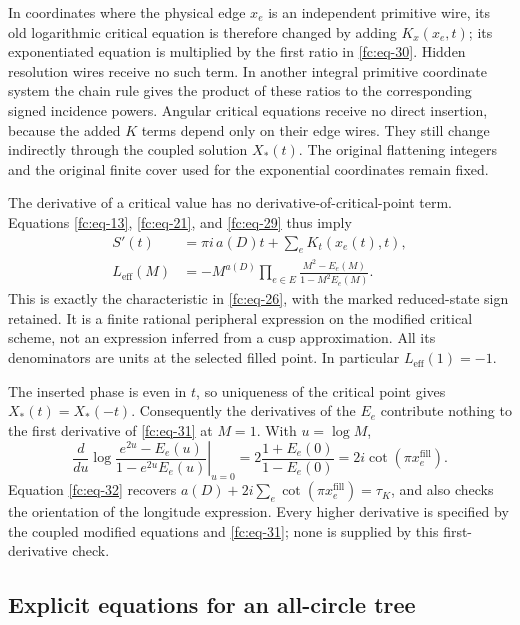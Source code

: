 In coordinates where the physical edge \(x_e\) is an independent primitive wire, its old logarithmic critical equation is therefore changed by adding \(K_x(x_e,t)\); its exponentiated equation is multiplied by the first ratio in \eqref{fc:eq-30}. Hidden resolution wires receive no such term. In another integral primitive coordinate system the chain rule gives the product of these ratios to the corresponding signed incidence powers. Angular critical equations receive no direct insertion, because the added \(K\) terms depend only on their edge wires. They still change indirectly through the coupled solution \(X_*(t)\). The original flattening integers and the original finite cover used for the exponential coordinates remain fixed.

The derivative of a critical value has no derivative-of-critical-point term. Equations \eqref{fc:eq-13}, \eqref{fc:eq-21}, and \eqref{fc:eq-29} thus imply
\begin{equation}\label{fc:eq-31}
\begin{aligned}
 S'(t)
   &=\pi i\,a(D)t+\sum_e K_t(x_e(t),t),\\
 L_{\mathrm{eff}}(M)
   &=-M^{a(D)}
       \prod_{e\in E}\frac{M^2-E_e(M)}{1-M^2E_e(M)}.
 \end{aligned}
\end{equation}
 This is exactly the characteristic in \eqref{fc:eq-26}, with the marked reduced-state sign retained. It is a finite rational peripheral expression on the modified critical scheme, not an expression inferred from a cusp approximation. All its denominators are units at the selected filled point. In particular \(L_{\mathrm{eff}}(1)=-1\).

The inserted phase is even in \(t\), so uniqueness of the critical point gives \(X_*(t)=X_*(-t)\). Consequently the derivatives of the \(E_e\) contribute nothing to the first derivative of \eqref{fc:eq-31} at \(M=1\). With \(u=\log M\),
\begin{equation}\label{fc:eq-32}
\left.\frac{d}{du}
 \log\frac{e^{2u}-E_e(u)}{1-e^{2u}E_e(u)}
 \right|_{u=0}
   =2\frac{1+E_e(0)}{1-E_e(0)}
   =2i\cot(\pi x_e^{\mathrm{fill}}).
\end{equation}
 Equation \eqref{fc:eq-32} recovers \(a(D)+2i\sum_e\cot(\pi x_e^{\mathrm{fill}})=\tau_K\), and also checks the orientation of the longitude expression. Every higher derivative is specified by the coupled modified equations and \eqref{fc:eq-31}; none is supplied by this first-derivative check.

\subsection{Explicit equations for an all-circle tree}\label{fc:sec-7-2}

